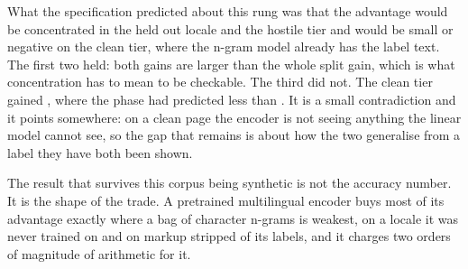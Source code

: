 What the specification predicted about this rung was that the advantage would be
concentrated in the held out locale and the hostile tier and would be small or
negative on the clean tier, where the n-gram model already has the label text.
The first two held: both gains are larger than the whole split gain, which is
what concentration has to mean to be checkable. The third did not. The clean tier
gained \vBertCleanGain{}, where the phase had predicted less than
\vPracticalThreshold{}. It is a small contradiction and it points somewhere: on a
clean page the encoder is not seeing anything the linear model cannot see, so the
gap that remains is about how the two generalise from a label they have both been
shown.

The result that survives this corpus being synthetic is not the accuracy number.
It is the shape of the trade. A pretrained multilingual encoder buys most of its
advantage exactly where a bag of character n-grams is weakest, on a locale it was
never trained on and on markup stripped of its labels, and it charges two orders
of magnitude of arithmetic for it.
